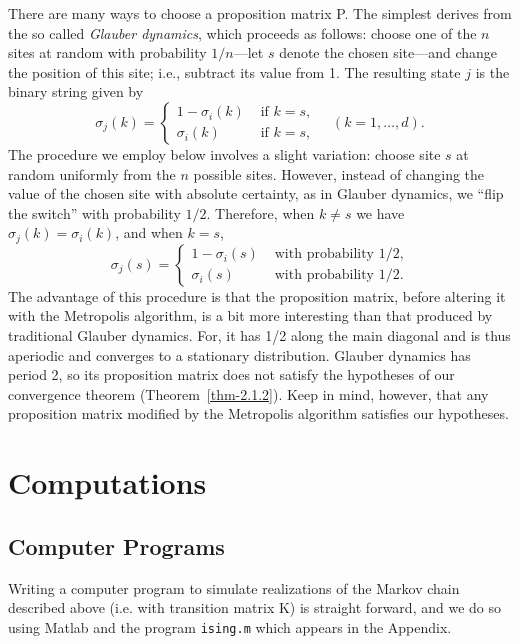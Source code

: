 \documentclass[12pt,letterpaper]{report}
\theoremstyle{plain}
\theoremstyle{definition}
\theoremstyle{remark}
\numberwithin{theorem}{chapter}
\numberwithin{claim}{chapter}
\numberwithin{equation}{chapter}
\numberwithin{conjecture}{chapter}
\newcommand\<{\ensuremath{\langle}}
\renewcommand\>{\ensuremath{\rangle}}
\begin{document}
There are many ways to choose a proposition matrix P. The simplest derives from the
so called \emph{Glauber dynamics}, which proceeds as follows: choose one of the
$n$ sites at random with probability $1/n$---let $s$ denote the chosen
site---and change the position of this site; i.e., subtract its value from 1.
The resulting state $j$ is the 
binary string
given by
\begin{equation*}
\sigma_j(k) = 
\begin{cases}
1-\sigma_i(k) & \text{ if $k =s$},\\
\sigma_i(k) & \text{ if $k =s$},
\end{cases}\quad (k = 1, \dots, d).
\end{equation*}
%
%
%
%
The procedure we employ below involves a slight variation: choose site $s$ at
random uniformly from the $n$ possible sites. However, instead of changing the
value of the chosen site with absolute certainty, as in Glauber dynamics, we
``flip the switch'' with probability $1/2$. 
Therefore, when $k \neq s$
we have $\sigma_j(k) = \sigma_i(k)$, and when $k = s$,
\begin{equation*}
\sigma_j(s) = 
\begin{cases}
1-\sigma_i(s) & \text{ with probability 1/2},\\
\sigma_i(s) & \text{ with probability 1/2}.
\end{cases}
\end{equation*}
The advantage of this procedure is that the proposition matrix, before altering
it with the Metropolis algorithm, is a bit more interesting than that produced
by traditional Glauber dynamics. For, it has 1/2 along the main diagonal and is
thus aperiodic and converges to a stationary distribution. Glauber dynamics has
period 2, so its proposition matrix does not satisfy the hypotheses of our
convergence theorem (Theorem~\ref{thm-2.1.2}). Keep in mind, however, that any
proposition matrix modified by the Metropolis algorithm satisfies our hypotheses.
\section{Computations}
\label{sec:computations}
\subsection{Computer Programs}
Writing a computer program to simulate realizations of the Markov chain described
above (i.e. with transition matrix K) is straight forward, and we do so using
Matlab and the program {\tt ising.m} which appears in the Appendix.
\end{document}
